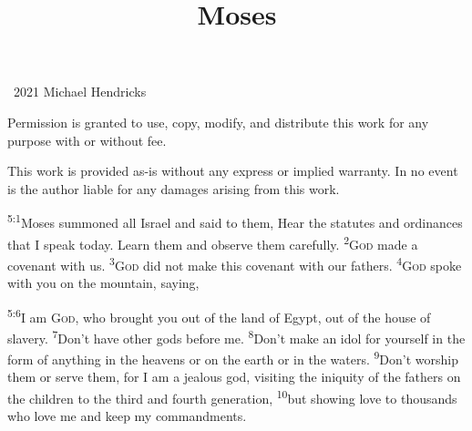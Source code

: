 \documentclass[openany,12pt,english]{book}
\title{Moses}
\author{}
\date{}
\newenvironment{para}{\par\pretolerance=100\tolerance=200\setlength{\emergencystretch}{0.6em}\relax}{\par}
\begin{document}
\maketitle

{
\thispagestyle{empty}
\vspace*{\fill}
\begin{changemargin}{.8in}{.8in}
\begin{center}
\textcopyright{}~2021 Michael Hendricks

\vspace{0.5\baselineskip}

Permission is granted to use, copy, modify, and distribute
this work for any purpose with or without fee.

\vspace{0.5\baselineskip}

This work is provided as-is without any express or implied
warranty. In no event is the author liable for any damages
arising from this work.
\end{center}
\end{changemargin}
}
\clearpage{}

\clearpage{}

\markboth{}{}


\begin{para}
    \textsuperscript{5:1}\thinspace{}Mo\-ses summoned all Israel and said to them, Hear the statutes and ordinances that I speak to\-day. Learn them and ob\-serve them care\-ful\-ly.
    \textsuperscript{2}\thinspace{}\textsc{God} made a cov\-e\-nant with us.
    \textsuperscript{3}\thinspace{}\textsc{God} did not make this cov\-e\-nant with our fathers.
    \textsuperscript{4}\thinspace{}\textsc{God} spoke with you on the moun\-tain, say\-ing,
\end{para}

\begin{para}
    \textsuperscript{5:6}\thinspace{}I am \textsc{God}, who brought you out of the land of Egypt, out of the house of slav\-er\-y.
    \textsuperscript{7}\thinspace{}Don't have oth\-er gods be\-fore me.
    \textsuperscript{8}\thinspace{}Don't make an i\-dol for your\-self in the form of any\-thing in the heavens or on the earth or in the waters.
    \textsuperscript{9}\thinspace{}Don't wor\-ship them or serve them, for I am a jeal\-ous god, visiting the in\-iq\-ui\-ty of the fathers on the chil\-dren to the third and fourth gen\-er\-a\-tion,
    \textsuperscript{10}\thinspace{}but show\-ing love to thousands who love me and keep my commandments.
\end{para}
\end{document}
